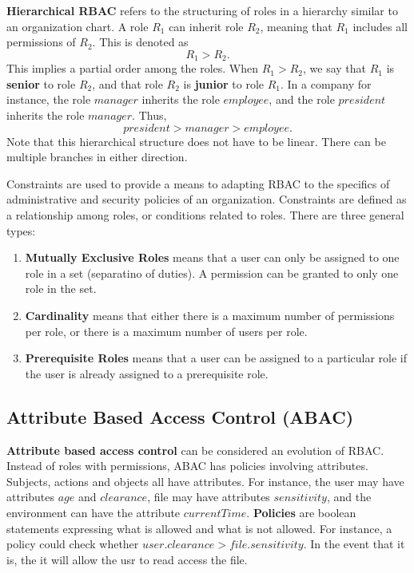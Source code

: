 \documentclass[11pt]{article}
\theoremstyle{plain} %
\theoremstyle{definition}
\theoremstyle{example}
\theoremstyle{remark}
\begin{document}
\textbf{Hierarchical RBAC} refers to the structuring of roles in a hierarchy similar to an organization chart. A role $R_1$ can inherit role $R_2$, meaning that $R_1$ includes all permissions of $R_2$. This is denoted as 
$$R_1 > R_2.$$
This implies a partial order among the roles. When $R_1 > R_2$, we say that $R_1$ is \textbf{senior} to role $R_2$, and that role $R_2$ is \textbf{junior} to role $R_1$. In a company for instance, the role $manager$ inherits the role $employee$, and the role $president$ inherits the role $manager$. Thus, 
$$president > manager > employee.$$
Note that this hierarchical structure does not have to be linear. There can be multiple branches in either direction. 

Constraints are used to provide a means to adapting RBAC to the specifics of administrative and security policies of an organization. Constraints are defined as a relationship among roles, or conditions related to roles. There are three general types:
\begin{enumerate}
	\item \textbf{Mutually Exclusive Roles} means that a user can only be assigned to one role in a set (separatino of duties). A permission can be granted to only one role in the set. 
	\item \textbf{Cardinality} means that either there is a maximum number of permissions per role, or there is a maximum number of users per role. 
	\item \textbf{Prerequisite Roles} means that a user can be assigned to a particular role if the user is already assigned to a prerequisite role. 
\end{enumerate}

\subsection{Attribute Based Access Control (ABAC)}

\textbf{Attribute based access control} can be considered an evolution of RBAC. Instead of roles with permissions, ABAC has policies involving attributes. Subjects, actions and objects all have attributes. For instance, the user may have attributes $age$ and $clearance$, file may have attributes $sensitivity$, and the environment can have the attribute $currentTime$. \textbf{Policies} are boolean statements expressing what is allowed and what is not allowed. For instance, a policy could check whether $user.clearance > file.sensitivity$. In the event that it is, the it will allow the usr to read access the file. 
\end{document}
